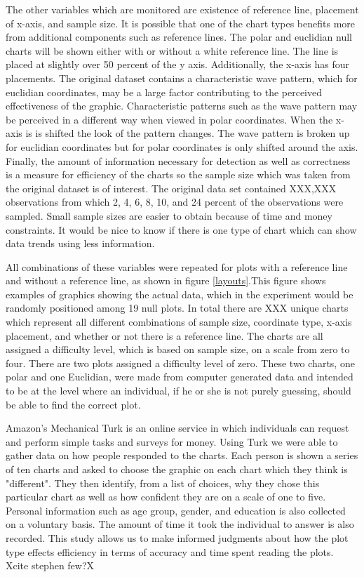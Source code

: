 The other variables which are monitored are existence of reference line, placement of x-axis, and sample size. It is possible that one of the chart types benefits more from additional components such as reference lines. The polar and euclidian null charts will be shown either with or without a white reference line. The line is placed at slightly over 50 percent of the y axis. Additionally, the x-axis has four placements. The original dataset contains a characteristic wave pattern, which for euclidian coordinates, may be a large factor contributing to the perceived effectiveness of the graphic. Characteristic patterns such as the wave pattern may be perceived in a different way when viewed in polar coordinates. When the x-axis is is shifted the look of the pattern changes. The wave pattern is broken up for euclidian coordinates but for polar coordinates is only shifted around the axis. Finally, the amount of information necessary for detection as well as correctness is a measure for efficiency of the charts so the sample size which was taken from the original dataset is of interest. The original data set contained XXX,XXX observations from which 2, 4, 6, 8, 10, and 24 percent of the observations were sampled. Small sample sizes are easier to obtain because of time and money constraints. It would be nice to know if there is one type of chart which can show data trends using less information. 


 All combinations of these variables were repeated for plots with a reference line and without a reference line, as shown in figure \ref{layouts}.This figure shows examples of graphics showing the actual data, which in the experiment would be randomly positioned among 19 null plots. In total there are XXX unique charts which represent all different combinations of sample size, coordinate type, x-axis placement, and whether or not there is a reference line. The charts are all assigned a difficulty level, which is based on sample size, on a scale from zero to four. There are two plots assigned a difficulty level of zero. These two charts, one polar and one Euclidian, were made from computer generated data and intended to be at the level where an individual, if he or she is not purely guessing, should be able to find the correct plot. 


Amazon's Mechanical Turk is an online service in which individuals can request and perform simple tasks and surveys for money. Using Turk we were able to gather data on how people responded to the charts. Each person is shown a series of ten charts and asked to choose the graphic on each chart which they think is "different". They then identify, from a list of choices, why they chose this particular chart as well as how confident they are on a scale of one to five. Personal information such as age group, gender, and education is also collected on a voluntary basis. The amount of time it took the individual to answer is also recorded. This study allows us to make informed judgments about how the plot type effects efficiency in terms of accuracy and time spent reading the plots. Xcite stephen few?X

